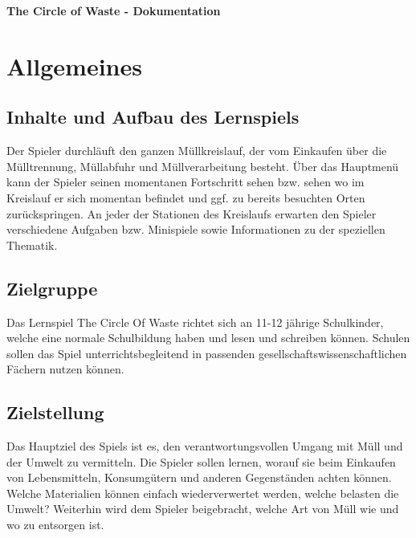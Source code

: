 \documentclass[a4paper]{article}
\newcommand{\changefont}[3]{
\fontfamily{#1} \fontseries{#2} \fontshape{#3} \selectfont}
\begin{document}
\changefont{cmss}{m}{n} %

\begin{center}
\textbf{\Large The Circle of Waste - Dokumentation}
\end{center}

\vspace{5mm}



\tableofcontents

\pagebreak

\section{Allgemeines}
    \subsection{Inhalte und Aufbau des Lernspiels}
        Der Spieler durchläuft den ganzen Müllkreislauf, der vom Einkaufen über die Mülltrennung, Müllabfuhr und Müllverarbeitung besteht. Über das Hauptmenü kann der Spieler seinen momentanen Fortschritt sehen bzw. sehen wo im Kreislauf er sich momentan befindet und ggf. zu bereits besuchten Orten zurückspringen. An jeder der Stationen des Kreislaufs erwarten den Spieler verschiedene Aufgaben bzw. Minispiele sowie Informationen zu der speziellen Thematik.
    \subsection{Zielgruppe}
        Das Lernspiel The Circle Of Waste richtet sich an 11-12 jährige Schulkinder, welche eine normale Schulbildung haben und lesen und schreiben können. Schulen sollen das Spiel unterrichtsbegleitend in passenden gesellschaftswissenschaftlichen Fächern nutzen können.
    \subsection{Zielstellung}
        Das Hauptziel des Spiels ist es, den verantwortungsvollen Umgang mit Müll und der Umwelt zu vermitteln. Die Spieler sollen lernen, worauf sie beim Einkaufen von Lebensmitteln, Konsumgütern und anderen Gegenständen achten können. Welche Materialien können einfach wiederverwertet werden, welche belasten die Umwelt? Weiterhin wird dem Spieler beigebracht, welche Art von Müll wie und wo zu entsorgen ist.
\end{document}
